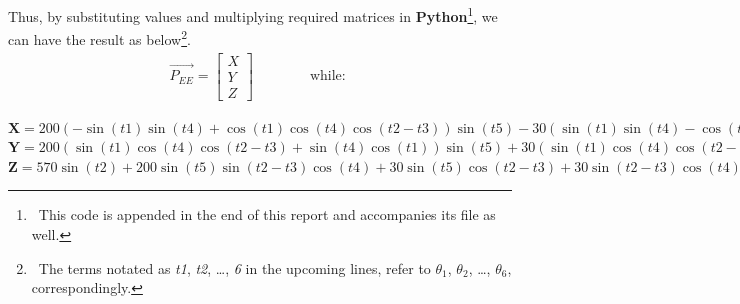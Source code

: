 \documentclass[conference]{IEEEtran}
\begin{document}
Thus, by substituting values and multiplying required matrices in \textbf{Python}\footnote{\, This code is appended in the end of this report and accompanies its file as well.}, we can have the result as below\footnote{\, The terms notated as \textit{t1}, \textit{t2}, \dots, \textit{6} in the upcoming lines, refer to $\theta_1$, $\theta_2$, \dots, $\theta_6$, correspondingly.}.
\begin{align*}
    \vec{\mathbf{\mathit{P_{EE}}}} = \begin{bmatrix}
                                         X \\
                                         Y \\
                                         Z
                                     \end{bmatrix}
    \quad\quad\quad\quad \text{while: }
\end{align*}


\begin{small}
    $\mathbf{X} = 200  (-\sin(t1)  \sin(t4) + \cos(t1)  \cos(t4)  \cos(t2 - t3))  \sin(t5) - 30  (\sin(t1)  \sin(t4) - \cos(t1)  \cos(t4)  \cos(t2 - t3))  \cos(t5) + 10  (-64  \sin(t2 - t3) + 57  \cos(t2) + 20  \cos(t2 - t3) + 15)  \cos(t1) - 30  \sin(t5)  \sin(t2 - t3)  \cos(t1) + 200  \sin(t2 - t3)  \cos(t1)  \cos(t5)$ \\

    $\mathbf{Y} = 200  (\sin(t1)  \cos(t4)  \cos(t2 - t3) + \sin(t4)  \cos(t1))  \sin(t5) + 30  (\sin(t1)  \cos(t4)  \cos(t2 - t3) + \sin(t4)  \cos(t1))  \cos(t5) + 10  (-64  \sin(t2 - t3) + 57  \cos(t2) + 20  \cos(t2 - t3) + 15)  \sin(t1) - 30  \sin(t1)  \sin(t5)  \sin(t2 - t3) + 200  \sin(t1)  \sin(t2 - t3)  \cos(t5)$ \\

    $\mathbf{Z} = 570  \sin(t2) + 200  \sin(t5)  \sin(t2 - t3)  \cos(t4) + 30  \sin(t5)  \cos(t2 - t3) + 30  \sin(t2 - t3)  \cos(t4)  \cos(t5) + 200  \sin(t2 - t3) - 200  \cos(t5)  \cos(t2 - t3) + 640  \cos(t2 - t3) + 450$
\end{small}
\end{document}
